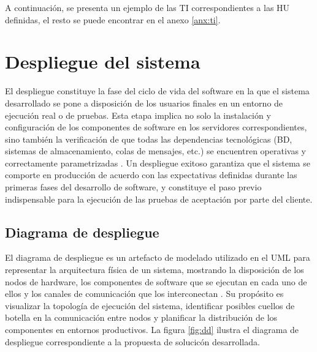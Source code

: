 A continuación, se presenta un ejemplo de las \ac{TI} correspondientes a las \ac{HU} definidas, el resto se puede
encontrar en el anexo \ref{anx:ti}.


\begin{engineeringtask}[tb:engtask_t020]
\end{engineeringtask}


\section{Despliegue del sistema}

El despliegue constituye la fase del ciclo de vida del software en la que el sistema 
desarrollado se pone a disposición de los usuarios finales en un entorno de ejecución real o 
de pruebas. Esta etapa implica no solo la instalación y configuración de los componentes de
software en los servidores correspondientes, sino también la verificación de que todas las 
dependencias tecnológicas (\ac{BD}, sistemas de almacenamiento, colas de mensajes, 
etc.) se encuentren operativas y correctamente parametrizadas \citep{bass2012software}. 
Un despliegue exitoso garantiza que el sistema se comporte en producción de acuerdo con 
las expectativas definidas durante las primeras fases del desarrollo de software, y constituye el paso 
previo indispensable para la ejecución de las pruebas de aceptación por parte del cliente.

\subsection{Diagrama de despliegue}

El diagrama de despliegue es un artefacto de modelado utilizado en el \ac{UML} 
para representar la arquitectura física de un sistema, mostrando 
la disposición de los nodos de hardware, los componentes de software que se ejecutan en cada 
uno de ellos y los canales de comunicación que los interconectan \citep{booch2005uml}. Su 
propósito es visualizar la topología de ejecución del sistema, identificar posibles cuellos 
de botella en la comunicación entre nodos y planificar la distribución de los componentes 
en entornos productivos. La figura \ref{fig:dd} ilustra el diagrama de despliegue 
correspondiente a la propuesta de solucicón desarrollada.

